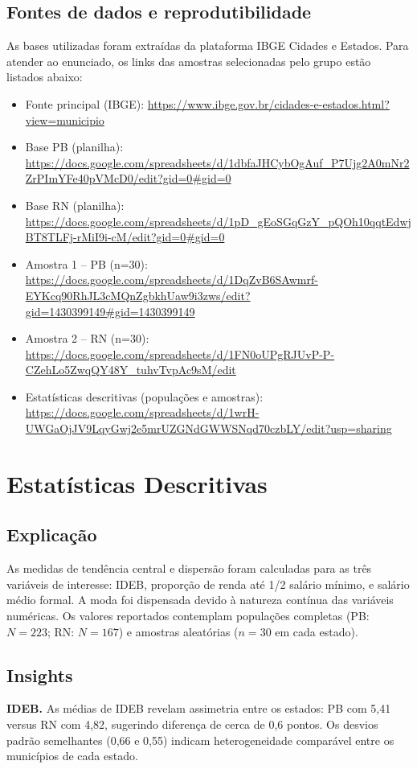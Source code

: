\documentclass[10pt, a4paper, twocolumn]{article}
\begin{document}
\subsection{Fontes de dados e reprodutibilidade}
As bases utilizadas foram extraídas da plataforma IBGE Cidades e Estados. Para atender ao enunciado, os links das amostras selecionadas pelo grupo estão listados abaixo:
\begin{itemize}
    \item Fonte principal (IBGE): \url{https://www.ibge.gov.br/cidades-e-estados.html?view=municipio}
    \item Base PB (planilha): \url{https://docs.google.com/spreadsheets/d/1dbfaJHCybOgAuf_P7Ujg2A0mNr2ZrPImYFe40pVMcD0/edit?gid=0#gid=0}
    \item Base RN (planilha): \url{https://docs.google.com/spreadsheets/d/1pD_gEoSGqGzY_pQOh10qqtEdwjBT8TLFj-rMiI9i-cM/edit?gid=0#gid=0}
    \item Amostra 1 -- PB (n=30): \url{https://docs.google.com/spreadsheets/d/1DqZvB6SAwmrf-EYKcq90RhJL3cMQnZgbkhUaw9i3zws/edit?gid=1430399149#gid=1430399149}
    \item Amostra 2 -- RN (n=30): \url{https://docs.google.com/spreadsheets/d/1FN0oUPgRJUvP-P-CZehLo5ZwqQY48Y_tuhvTvpAc9sM/edit}
    \item Estatísticas descritivas (populações e amostras): \url{https://docs.google.com/spreadsheets/d/1wrH-UWGaOjJV9LqyGwj2e5mrUZGNdGWWSNqd70czbLY/edit?usp=sharing}
\end{itemize}

\section{Estatísticas Descritivas}
\subsection{Explicação}
As medidas de tendência central e dispersão foram calculadas para as três variáveis de interesse: IDEB, proporção de renda até 1/2 salário mínimo, e salário médio formal. A moda foi dispensada devido à natureza contínua das variáveis numéricas. Os valores reportados contemplam populações completas (PB: $N=223$; RN: $N=167$) e amostras aleatórias ($n=30$ em cada estado).

\subsection{Insights}
\textbf{IDEB.} As médias de IDEB revelam assimetria entre os estados: PB com 5,41 versus RN com 4,82, sugerindo diferença de cerca de 0,6 pontos. Os desvios padrão semelhantes (0,66 e 0,55) indicam heterogeneidade comparável entre os municípios de cada estado.
\end{document}
